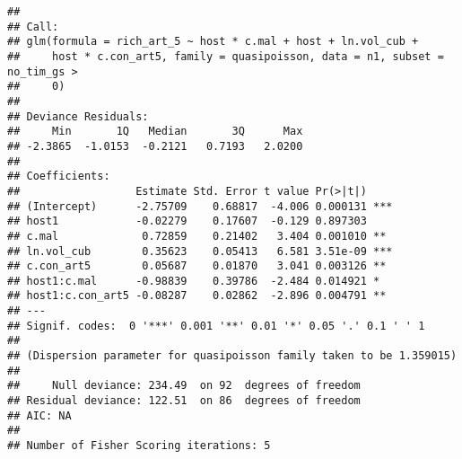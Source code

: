 \documentclass[]{article}
\newenvironment{Shaded}{\begin{snugshade}}{\end{snugshade}}
\newcommand{\KeywordTok}[1]{\textcolor[rgb]{0.13,0.29,0.53}{\textbf{#1}}}
\newcommand{\DataTypeTok}[1]{\textcolor[rgb]{0.13,0.29,0.53}{#1}}
\newcommand{\DecValTok}[1]{\textcolor[rgb]{0.00,0.00,0.81}{#1}}
\newcommand{\StringTok}[1]{\textcolor[rgb]{0.31,0.60,0.02}{#1}}
\newcommand{\OperatorTok}[1]{\textcolor[rgb]{0.81,0.36,0.00}{\textbf{#1}}}
\newcommand{\NormalTok}[1]{#1}
\begin{document}
\begin{verbatim}
## 
## Call:
## glm(formula = rich_art_5 ~ host * c.mal + host + ln.vol_cub + 
##     host * c.con_art5, family = quasipoisson, data = n1, subset = no_tim_gs > 
##     0)
## 
## Deviance Residuals: 
##     Min       1Q   Median       3Q      Max  
## -2.3865  -1.0153  -0.2121   0.7193   2.0200  
## 
## Coefficients:
##                  Estimate Std. Error t value Pr(>|t|)    
## (Intercept)      -2.75709    0.68817  -4.006 0.000131 ***
## host1            -0.02279    0.17607  -0.129 0.897303    
## c.mal             0.72859    0.21402   3.404 0.001010 ** 
## ln.vol_cub        0.35623    0.05413   6.581 3.51e-09 ***
## c.con_art5        0.05687    0.01870   3.041 0.003126 ** 
## host1:c.mal      -0.98839    0.39786  -2.484 0.014921 *  
## host1:c.con_art5 -0.08287    0.02862  -2.896 0.004791 ** 
## ---
## Signif. codes:  0 '***' 0.001 '**' 0.01 '*' 0.05 '.' 0.1 ' ' 1
## 
## (Dispersion parameter for quasipoisson family taken to be 1.359015)
## 
##     Null deviance: 234.49  on 92  degrees of freedom
## Residual deviance: 122.51  on 86  degrees of freedom
## AIC: NA
## 
## Number of Fisher Scoring iterations: 5
\end{verbatim}

\begin{Shaded}
\end{Shaded}
\end{document}
